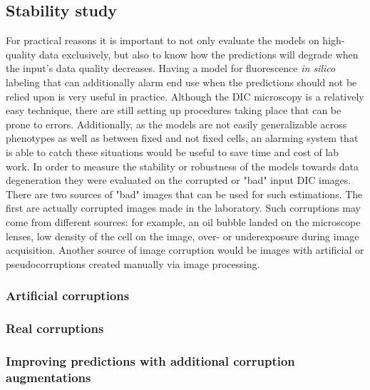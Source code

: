 \subsection{Stability study}
    For practical reasons it is important to not only evaluate the models on high-quality data exclusively, but also to know how the predictions will degrade when the input's data quality decreases. Having a model for fluorescence \textit{in silico} labeling that can additionally alarm end use when the predictions should not be relied upon is very useful in practice. Although the DIC microscopy is a relatively easy technique, there are still setting up procedures taking place that can be prone to errors. Additionally, as the models are not easily generalizable across phenotypes as well as between fixed and not fixed cells, an alarming system that is able to catch these situations would be useful to save time and cost of lab work. In order to measure the stability or robustness of the models towards data degeneration they were evaluated on the corrupted or "bad" input DIC images. There are two sources of "bad" images that can be used for such estimations. The first are actually corrupted images made in the laboratory. Such corruptions may come from different sources: for example, an oil bubble landed on the microscope lenses, low density of the cell on the image, over- or underexposure during image acquisition. Another source of image corruption would be images with artificial or pseudocorruptions created manually via image processing. 
    
    \subsubsection{Artificial corruptions}
        
    \subsubsection{Real corruptions}
        
    \subsubsection{Improving predictions with additional corruption augmentations}
        \label{section:augments-againts-corruptions}
        